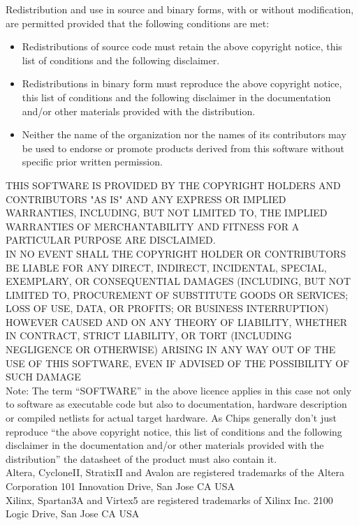 \documentclass{ruschidoc}
\begin{document}
Redistribution and use in source and binary forms, with or without modification, are
permitted provided that the following conditions are met:
\begin{itemize}
\item Redistributions of source code must retain the above copyright notice, this
  list of conditions and the following disclaimer.
\item Redistributions in binary form must reproduce the above copyright notice, this
  list of conditions and the following disclaimer in the documentation and/or other
  materials provided with the distribution.
\item Neither the name of the organization nor the names of its contributors may be
  used to endorse or promote products derived from this software without specific
  prior written permission.
\end{itemize}
 THIS SOFTWARE IS PROVIDED BY THE COPYRIGHT HOLDERS AND CONTRIBUTORS "AS IS"
 AND ANY EXPRESS OR IMPLIED WARRANTIES, INCLUDING, BUT NOT LIMITED TO, THE
 IMPLIED WARRANTIES OF MERCHANTABILITY AND FITNESS FOR A PARTICULAR PURPOSE
 ARE DISCLAIMED. \\
IN NO EVENT SHALL THE COPYRIGHT HOLDER OR CONTRIBUTORS BE
 LIABLE FOR ANY DIRECT, INDIRECT, INCIDENTAL, SPECIAL, EXEMPLARY,
 OR CONSEQUENTIAL DAMAGES (INCLUDING, BUT NOT LIMITED TO, PROCUREMENT OF
 SUBSTITUTE GOODS OR SERVICES; LOSS OF USE, DATA, OR PROFITS; OR BUSINESS
 INTERRUPTION) HOWEVER CAUSED AND ON ANY THEORY OF LIABILITY, WHETHER IN
 CONTRACT, STRICT LIABILITY, OR TORT (INCLUDING NEGLIGENCE OR OTHERWISE)
 ARISING IN ANY WAY OUT OF THE USE OF THIS SOFTWARE, EVEN IF ADVISED OF
 THE POSSIBILITY OF SUCH DAMAGE\\

 Note: The term ``SOFTWARE'' in the above licence applies in this case not only to
 software as executable code but also to documentation, hardware description or
 compiled netlists for actual target hardware. As Chips generally don't just
 reproduce ``the above copyright notice, this list of conditions and the following
 disclaimer in the documentation and/or other materials provided with the
 distribution'' the datasheet of the product must also contain it.\\

Altera, CycloneII, StratixII and Avalon are registered trademarks of the Altera Corporation
  101 Innovation Drive, San Jose CA USA \\
 Xilinx, Spartan3A and Virtex5 are registered trademarks of Xilinx Inc. 2100 Logic Drive, San Jose CA USA 

\newpage

\printacronym
\printglossary


\revisionTable
\end{document}
